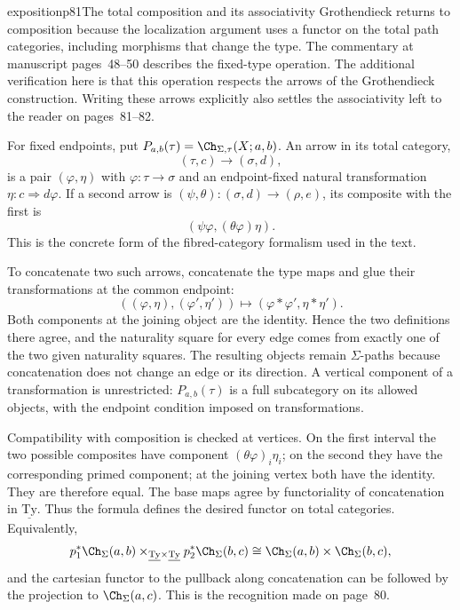 \begin{dcomment}{exposition}{p81}{The total composition and its associativity}
Grothendieck returns to composition because the localization argument uses a functor on the total path categories, including morphisms that change the type. The commentary at manuscript pages~48--50 describes the fixed-type operation. The additional verification here is that this operation respects the arrows of the Grothendieck construction. Writing these arrows explicitly also settles the associativity left to the reader on pages~81--82.

For fixed endpoints, put $P_{a,b}(\tau)=\Ch_{\Sigma,\tau}(X;a,b)$. An arrow in its total category,
\[
 (\tau,c)\longrightarrow(\sigma,d),
\]
is a pair $(\varphi,\eta)$ with $\varphi:\tau\to\sigma$ and an endpoint-fixed natural transformation $\eta:c\Rightarrow d\varphi$. If a second arrow is $(\psi,\theta):(\sigma,d)\to(\rho,e)$, its composite with the first is
\[
 (\psi\varphi,(\theta\varphi)\eta).
\]
This is the concrete form of the fibred-category formalism used in the text.

To concatenate two such arrows, concatenate the type maps and glue their transformations at the common endpoint:
\[
 ((\varphi,\eta),(\varphi',\eta'))
       \longmapsto(\varphi*\varphi',\eta*\eta').
\]
Both components at the joining object are the identity. Hence the two definitions there agree, and the naturality square for every edge comes from exactly one of the two given naturality squares. The resulting objects remain $\Sigma$-paths because concatenation does not change an edge or its direction. A vertical component of a transformation is unrestricted: $P_{a,b}(\tau)$ is a full subcategory on its allowed objects, with the endpoint condition imposed on transformations.

Compatibility with composition is checked at vertices. On the first interval the two possible composites have component $(\theta\varphi)_i\eta_i$; on the second they have the corresponding primed component; at the joining vertex both have the identity. They are therefore equal. The base maps agree by functoriality of concatenation in $\underline{\mathrm{Ty}}$. Thus the formula defines the desired functor on total categories. Equivalently,
\[
 p_1^*\Ch_\Sigma(a,b)\times_{\underline{\mathrm{Ty}}\times\underline{\mathrm{Ty}}}
 p_2^*\Ch_\Sigma(b,c)
 \cong \Ch_\Sigma(a,b)\times\Ch_\Sigma(b,c),
\]
and the cartesian functor to the pullback along concatenation can be followed by the projection to $\Ch_\Sigma(a,c)$. This is the recognition made on page~80.


\end{dcomment}

